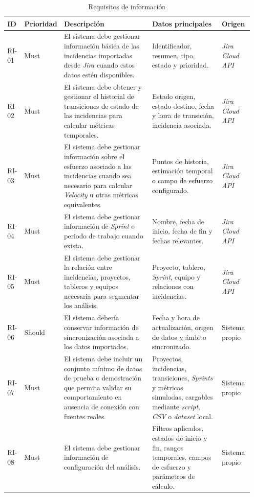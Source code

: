 {\renewcommand{\arraystretch}{1.28}\footnotesize
\begin{longtable}{p{1.2cm}p{1.65cm}p{4.6cm}p{3.35cm}p{1.65cm}}
\caption{Requisitos de información}\label{tab:requisitos-informacion}\\
\toprule
\textbf{ID} & \textbf{Prioridad} & \textbf{Descripción} & \textbf{Datos principales} & \textbf{Origen} \\
\midrule
RI-01 & Must & El sistema debe gestionar información básica de las incidencias importadas desde \textit{Jira} cuando estos datos estén disponibles. & Identificador, resumen, tipo, estado y prioridad. & \textit{Jira Cloud} \textit{API} \\
RI-02 & Must & El sistema debe obtener y gestionar el historial de transiciones de estado de las incidencias para calcular métricas temporales. & Estado origen, estado destino, fecha y hora de transición, incidencia asociada. & \textit{Jira Cloud} \textit{API} \\
RI-03 & Must & El sistema debe gestionar información sobre el esfuerzo asociado a las incidencias cuando sea necesario para calcular \textit{Velocity} u otras métricas equivalentes. & Puntos de historia, estimación temporal o campo de esfuerzo configurado. & \textit{Jira Cloud} \textit{API} \\
RI-04 & Must & El sistema debe gestionar información de \textit{Sprint} o periodo de trabajo cuando exista. & Nombre, fecha de inicio, fecha de fin y fechas relevantes. & \textit{Jira Cloud} \textit{API} \\
RI-05 & Must & El sistema debe gestionar la relación entre incidencias, proyectos, tableros y equipos necesaria para segmentar los análisis. & Proyecto, tablero, \textit{Sprint}, equipo y relaciones con incidencias. & \textit{Jira Cloud} \textit{API} \\
RI-06 & Should & El sistema debería conservar información de sincronización asociada a los datos importados. & Fecha y hora de actualización, origen de datos y ámbito sincronizado. & Sistema propio \\
RI-07 & Must & El sistema debe incluir un conjunto mínimo de datos de prueba o demostración que permita validar su comportamiento en ausencia de conexión con fuentes reales. & Proyectos, incidencias, transiciones, \textit{Sprints} y métricas simuladas, cargables mediante \textit{script}, \textit{CSV} o \textit{dataset} local. & Sistema propio \\
RI-08 & Must & El sistema debe gestionar información de configuración del análisis. & Filtros aplicados, estados de inicio y fin, rangos temporales, campos de esfuerzo y parámetros de cálculo. & Sistema propio \\

\end{longtable}}
